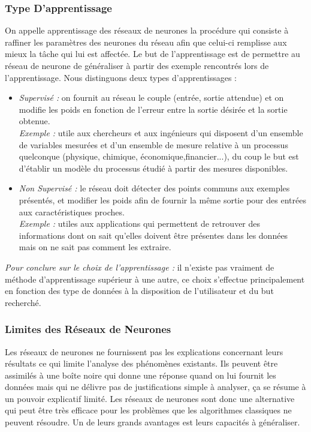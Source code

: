 \documentclass{article}
\begin{document}
		\subsubsection{Type D'apprentissage}
			On appelle apprentissage des réseaux de neurones la procédure qui consiste à raffiner les paramètres des neurones du réseau afin que celui-ci remplisse aux mieux la tâche qui lui est affectée. Le but de l'apprentissage est de permettre au réseau de neurone de généraliser à partir des exemple rencontrés lors de l'apprentissage.
Nous distinguons deux types d'apprentissages :
			\begin{itemize}
				\item \emph{Supervisé : }on fournit au réseau le couple (entrée, sortie attendue) et on modifie les poids en fonction de l'erreur entre la sortie désirée et la sortie obtenue.\\ \emph{Exemple : }utile aux chercheurs et aux ingénieurs qui disposent d'un ensemble de variables mesurées et d'un ensemble de mesure relative à un processus quelconque (physique, chimique, économique,financier...), du coup le but est d'établir un modèle du processus étudié à partir des mesures disponibles.
				\item \emph{Non Supervisé : }le réseau doit détecter des points communs aux exemples présentés, et modifier les poids afin de fournir la même sortie pour des entrées aux caractéristiques proches.\\ \emph{Exemple : }utiles aux applications qui permettent de retrouver des informations dont on sait qu'elles doivent être présentes dans les données mais on ne sait pas comment les extraire.
			\end{itemize}
			\emph{Pour conclure sur le choix de l'apprentissage : }il n'existe pas vraiment de méthode d'apprentissage supérieur à une autre, ce choix s'effectue principalement en fonction des type de données à la disposition de l'utilisateur et du but recherché.
		\subsubsection{Limites des Réseaux de Neurones}
			Les réseaux de neurones ne fournissent pas les explications concernant leurs résultats ce qui limite l'analyse des phénomènes existants. Ils peuvent être assimilés à une boîte noire qui donne une réponse quand on lui fournit les données mais qui ne délivre pas de justifications simple à analyser, ça se résume à un pouvoir explicatif limité.
			Les réseaux de neurones sont donc une alternative qui peut être très efficace pour les problèmes que les algorithmes classiques ne peuvent résoudre. Un de leurs grands avantages est leurs capacités à généraliser.
\end{document}
